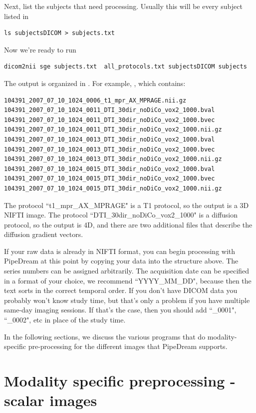 \documentclass{InsightArticle}
\begin{document}
Next, list the subjects that need processing. Usually this will be every subject listed in 
\begin{lstlisting}[style=bash]
  ls subjectsDICOM > subjects.txt  
\end{lstlisting}

Now we're ready to run
\begin{lstlisting}[style=bash]
 dicom2nii sge subjects.txt  all_protocols.txt subjectsDICOM subjects
\end{lstlisting}

The output is organized in . For example, , which contains:
\begin{lstlisting}[style=bash]
104391_2007_07_10_1024_0006_t1_mpr_AX_MPRAGE.nii.gz
104391_2007_07_10_1024_0011_DTI_30dir_noDiCo_vox2_1000.bval
104391_2007_07_10_1024_0011_DTI_30dir_noDiCo_vox2_1000.bvec
104391_2007_07_10_1024_0011_DTI_30dir_noDiCo_vox2_1000.nii.gz
104391_2007_07_10_1024_0013_DTI_30dir_noDiCo_vox2_1000.bval
104391_2007_07_10_1024_0013_DTI_30dir_noDiCo_vox2_1000.bvec
104391_2007_07_10_1024_0013_DTI_30dir_noDiCo_vox2_1000.nii.gz
104391_2007_07_10_1024_0015_DTI_30dir_noDiCo_vox2_1000.bval
104391_2007_07_10_1024_0015_DTI_30dir_noDiCo_vox2_1000.bvec
104391_2007_07_10_1024_0015_DTI_30dir_noDiCo_vox2_1000.nii.gz
\end{lstlisting}
The protocol ``t1\_mpr\_AX\_MPRAGE" is a T1 protocol, so the output is a 3D NIFTI image. The protocol ``DTI\_30dir\_noDiCo\_vox2\_1000" is a diffusion protocol, so the output is 4D, and there are two additional files that describe the diffusion gradient vectors.

If your raw data is already in NIFTI format, you can begin processing with PipeDream at this point by copying your data into the structure above. The series numbers can be assigned arbitrarily. The acquisition date can be specified in a format of your choice, we recommend ``YYYY\_MM\_DD", because then the text sorts in the correct temporal order. If you don't have DICOM data you probably won't know study time, but that's only a problem if you have multiple same-day imaging sessions. If that's the case, then you should add ``\_0001", ``\_0002", etc in place of the study time.

In the following sections, we discuss the various programs that do modality-specific pre-processing for the different images that PipeDream supports.


\section{Modality specific preprocessing - scalar images}
\end{document}
